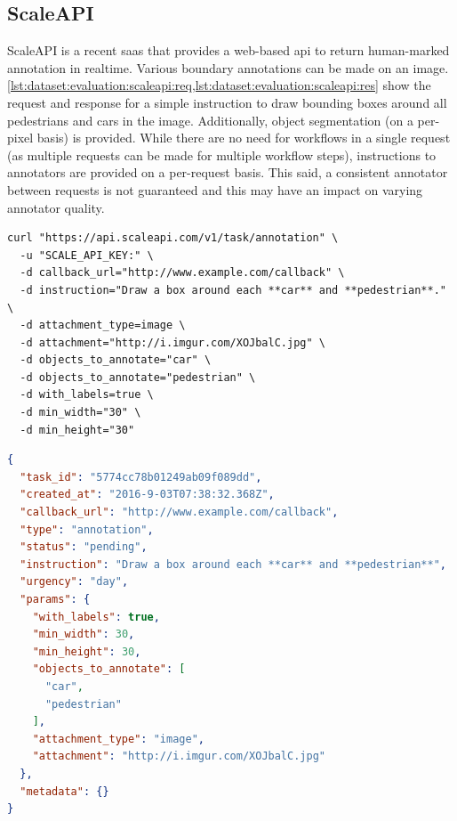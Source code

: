 
\vspace{-2em}
\subsection{ScaleAPI}

ScaleAPI is a recent \gls{saas} that provides a web-based \gls{api} to return human-marked annotation in realtime. Various boundary annotations can be made on an image. \cref{lst:dataset:evaluation:scaleapi:req,lst:dataset:evaluation:scaleapi:res} show the request and response for a simple instruction to draw bounding boxes around all pedestrians and cars in the image. Additionally, object segmentation (on a per-pixel basis) is provided. While there are no need for workflows in a single request (as multiple requests can be made for multiple workflow steps), instructions to annotators are provided on a per-request basis. This said, a consistent annotator between requests is not guaranteed and this may have an impact on varying annotator quality.

\begin{lstlisting}[language=CURL, label=lst:dataset:evaluation:scaleapi:req, caption={[Sample ScaleAPI request] A sample ScaleAPI HTTP request made using cURL\footnotemark.}]
curl "https://api.scaleapi.com/v1/task/annotation" \
  -u "SCALE_API_KEY:" \
  -d callback_url="http://www.example.com/callback" \
  -d instruction="Draw a box around each **car** and **pedestrian**." \
  -d attachment_type=image \
  -d attachment="http://i.imgur.com/XOJbalC.jpg" \
  -d objects_to_annotate="car" \
  -d objects_to_annotate="pedestrian" \
  -d with_labels=true \
  -d min_width="30" \
  -d min_height="30"  
\end{lstlisting}

\begin{lstlisting}[language=JSON, label=lst:dataset:evaluation:scaleapi:res, caption={[Sample ScaleAPI response] Sample \glsac{json} response from the request made in \cref{lst:dataset:evaluation:scaleapi:req}.}]
{
  "task_id": "5774cc78b01249ab09f089dd",
  "created_at": "2016-9-03T07:38:32.368Z",
  "callback_url": "http://www.example.com/callback",
  "type": "annotation",
  "status": "pending",
  "instruction": "Draw a box around each **car** and **pedestrian**",
  "urgency": "day",
  "params": {
    "with_labels": true,
    "min_width": 30,
    "min_height": 30,
    "objects_to_annotate": [
      "car",
      "pedestrian"
    ],
    "attachment_type": "image",
    "attachment": "http://i.imgur.com/XOJbalC.jpg"
  },
  "metadata": {}
}
\end{lstlisting}
